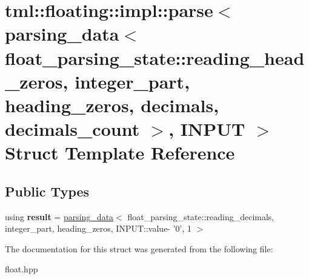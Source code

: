 \hypertarget{structtml_1_1floating_1_1impl_1_1parse_3_01parsing__data_3_01float__parsing__state_1_1reading__h60a480ec7e8df513262a989ce10e9d7a}{\section{tml\+:\+:floating\+:\+:impl\+:\+:parse$<$ parsing\+\_\+data$<$ float\+\_\+parsing\+\_\+state\+:\+:reading\+\_\+head\+\_\+zeros, integer\+\_\+part, heading\+\_\+zeros, decimals, decimals\+\_\+count $>$, I\+N\+P\+U\+T $>$ Struct Template Reference}
\label{structtml_1_1floating_1_1impl_1_1parse_3_01parsing__data_3_01float__parsing__state_1_1reading__h60a480ec7e8df513262a989ce10e9d7a}
}
\subsection*{Public Types}
\begin{DoxyCompactItemize}
\item 
\hypertarget{structtml_1_1floating_1_1impl_1_1parse_3_01parsing__data_3_01float__parsing__state_1_1reading__h60a480ec7e8df513262a989ce10e9d7a_a70a1dbb722a0cfc6aa525a38ef31f7e0}{using {\bfseries result} = \hyperlink{structtml_1_1floating_1_1impl_1_1parsing__data}{parsing\+\_\+data}$<$ float\+\_\+parsing\+\_\+state\+::reading\+\_\+decimals, integer\+\_\+part, heading\+\_\+zeros, I\+N\+P\+U\+T\+::value-\/ '0', 1 $>$}\label{structtml_1_1floating_1_1impl_1_1parse_3_01parsing__data_3_01float__parsing__state_1_1reading__h60a480ec7e8df513262a989ce10e9d7a_a70a1dbb722a0cfc6aa525a38ef31f7e0}

\end{DoxyCompactItemize}


The documentation for this struct was generated from the following file\+:\begin{DoxyCompactItemize}
\item 
float.\+hpp\end{DoxyCompactItemize}
